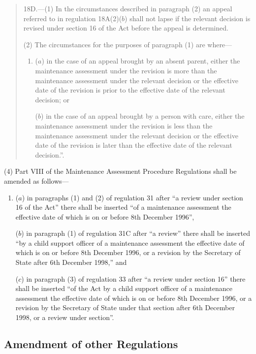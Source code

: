 \documentclass[12pt,a4paper]{article}
\begin{document}
\begin{quotation}
18D.—(1) In the circumstances described in paragraph (2) an appeal referred to in regulation 18A(2)($b$) shall not lapse if the relevant decision is revised under section 16 of the Act before the appeal is determined.

(2) The circumstances for the purposes of paragraph (1) are where—
\begin{enumerate}\item[]
($a$) in the case of an appeal brought by an absent parent, either the maintenance assessment under the revision is more than the maintenance assessment under the relevant decision or the effective date of the revision is prior to the effective date of the relevant decision; or

($b$) in the case of an appeal brought by a person with care, either the maintenance assessment under the revision is less than the maintenance assessment under the relevant decision or the effective date of the revision is later than the effective date of the relevant decision.”.
\end{enumerate}
\end{quotation}

(4) Part VIII of the Maintenance Assessment Procedure Regulations shall be amended as follows—
\begin{enumerate}\item[]
($a$) in paragraphs (1) and (2) of regulation 31 after “a review under section 16 of the Act” there shall be inserted “of a maintenance assessment the effective date of which is on or before 8th December 1996”,

($b$) in paragraph (1) of regulation 31C after “a review” there shall be inserted “by a child support officer of a maintenance assessment the effective date of which is on or before 8th December 1996, or a revision by the Secretary of State after 6th December 1998,” and

($c$) in paragraph (3) of regulation 33 after “a review under section 16” there shall be inserted “of the Act by a child support officer of a maintenance assessment the effective date of which is on or before 8th December 1996, or a revision by the Secretary of State under that section after 6th December 1998, or a review under section”.
\end{enumerate}

\subsection[3. Amendment of other Regulations]{Amendment of other Regulations}
\end{document}

